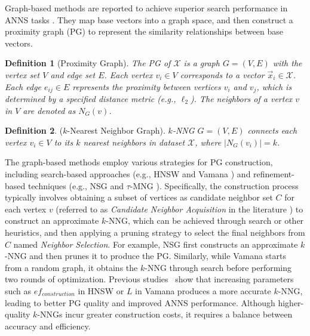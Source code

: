 \documentclass[acmsmall]{acmart}
\theoremstyle{remark}
\theoremstyle{definition}
\newtheorem{definition}{\bf Definition}
\begin{document}
Graph-based methods are reported to achieve superior search performance in ANNS tasks \cite{aumuller2020ann,li2019approximate,wang2021comprehensive}. They map base vectors into a graph space, and then construct a proximity graph (PG) to represent the similarity relationships between base vectors.

\begin{definition}[Proximity Graph]
	\textit{The PG of $\mathcal{X}$ is a graph $G = (V, E)$ with the vertex set $V$ and edge set $E$. Each vertex $v_i \in V$ corresponds to a vector $\vec{x}_i \in \mathcal{X}$. Each edge $e_{ij} \in E$ represents the proximity between vertices $v_i$ and $v_j$, which is determined by a specified distance metric (e.g., $\ell_2$). The neighbors of a vertex $v$ in $V$ are denoted as $N_G(v)$.}
	\label{def:proximity}
\end{definition}

\begin{definition}($k$-Nearest Neighbor Graph).
\textit{$k$-NNG $G = (V, E)$ connects each vertex $v_i \in V$ to its $k$ nearest neighbors in dataset $\mathcal{X}$, where $|N_G(v_i)| = k$.}
	\label{def:knn}
\end{definition}


The graph-based methods employ various strategies for PG construction, including search-based approaches (e.g., HNSW \cite{malkov2018efficient} and Vamana \cite{jayaram2019diskann}) and refinement-based techniques (e.g., NSG \cite{fu2017fast} and $\tau$-MNG \cite{peng2023efficient}). Specifically, the construction process typically involves obtaining a subset of vertices as candidate neighbor set $C$ for each vertex $v$ (referred to as \textit{Candidate Neighbor Acquisition} in the literature \cite{wang2021comprehensive, yang2024revisiting}) to construct an approximate $k$-NNG, which can be achieved through search or other heuristics, and then applying a pruning strategy to select the final neighbors from $C$ named \textit{Neighbor Selection}. 
For example, NSG \cite{fu2017fast} first constructs an approximate $k$-NNG and then prunes it to produce the PG. Similarly, while Vamana \cite{jayaram2019diskann} starts from a random graph, it obtains the $k$-NNG through search before performing two rounds of optimization. Previous studies~\cite{yang2024revisiting} show that increasing parameters such as $ef_{construction}$ in HNSW or $L$ in Vamana produces a more accurate $k$-NNG, leading to better PG quality and improved ANNS performance. Although higher-quality $k$-NNGs incur greater construction costs, it requires a balance between accuracy and efficiency.
\end{document}
